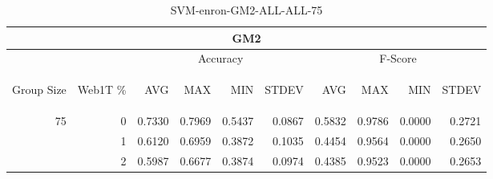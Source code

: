 \begin{center}
\begin{table}[htbp] 
 \begin{center}
\begin{tabular}{ | r | r | r | r | r | r | r | r | r | r |}
\hline
\multicolumn{10}{|c|}{GM2}\\
\hline
 & & \multicolumn{4}{|c|}{Accuracy} & \multicolumn{4}{|c|}{F-Score}\\ \cline{3-10}
\begin{sideways}Group Size\end{sideways} & \begin{sideways}Web1T \%\end{sideways} & \begin{sideways}AVG\end{sideways} & \begin{sideways}MAX\end{sideways} & \begin{sideways}MIN\end{sideways} & \begin{sideways}STDEV\end{sideways} & \begin{sideways}AVG\end{sideways} & \begin{sideways}MAX\end{sideways} & \begin{sideways}MIN\end{sideways} & \begin{sideways}STDEV\end{sideways}\\
\hline
\multirow{2}{*}{75}
 & 0 & 0.7330 & 0.7969 & 0.5437 & 0.0867 & 0.5832 & 0.9786 & 0.0000 & 0.2721\\ \cline{2-10}
 & 1 & 0.6120 & 0.6959 & 0.3872 & 0.1035 & 0.4454 & 0.9564 & 0.0000 & 0.2650\\ \cline{2-10}
 & 2 & 0.5987 & 0.6677 & 0.3874 & 0.0974 & 0.4385 & 0.9523 & 0.0000 & 0.2653\\ \cline{2-10}
\hline
\end{tabular}
\caption{SVM-enron-GM2-ALL-ALL-75}
\label{table:SVM-enron-GM2-ALL-ALL-75}
\end{center}
 \end{table}
\end{center}


